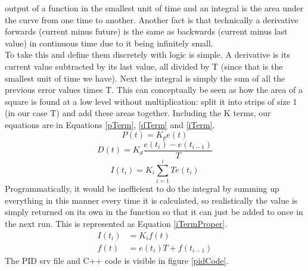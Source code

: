\documentclass{article}
\newcommand\tab[1][1cm]{\hspace*{#1}}
\begin{document}
output of a function in the smallest unit of time and an integral is the area
under the curve from one time to another. Another fact is that technically a
derivative forwards (current minus future) is the same as backwards (current
minus last value) in continuous time due to it being infinitely small. \\
\tab To take this and define them discretely with logic is simple. A derivative
is its current value subtracted by its last value, all divided by T (since that
is the smallest unit of time we have). Next the integral is simply the sum of
all the previous error values times T. This can conceptually be seen as how the
area of a square is found at a low level without multiplication: split it into
strips of size 1 (in our case T) and add these areas together. Including the K
terms, our equations are in Equations \ref{pTerm}, \ref{dTerm} and \ref{iTerm}.
\begin{equation}
    \label{pTerm}
    P(t) = K_{p}e(t) 
\end{equation}
\begin{equation}
    \label{dTerm}
    D(t) = K_{d} \frac{e(t_i) - e(t_{i-1})}{T}
\end{equation}
\begin{equation}
    \label{iTerm}
    I(t_i) = K_i \sum_{i=1}^i{Te(t_i)}
\end{equation}
Programmatically, it would be inefficient to do the integral by summing up
everything in this manner every time it is calculated, so realistically the
value is simply returned on its own in the function so that it can just be added
to once in the next run. This is represented as Equation \ref{iTermProper}.
\begin{equation}
    \label{iTermProper}
    \begin{split}
    I(t_i) & = K_{i}f(t) \\
    f(t) & = e(t_i)T + f(t_{i-1})
    \end{split}
\end{equation}
\newpage
The PID srv file and C++ code is visible in figure \ref{pidCode}.
\end{document}
